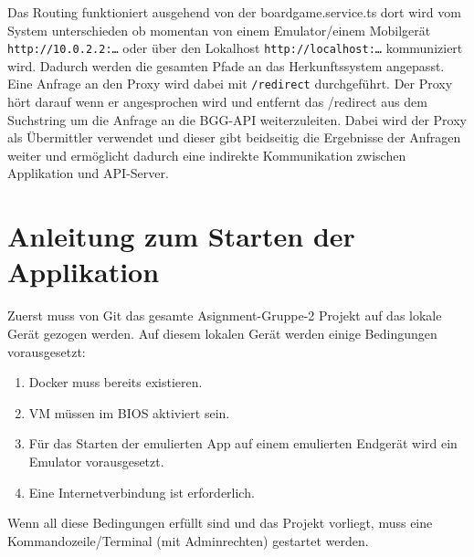 Das Routing funktioniert ausgehend von der boardgame.service.ts dort wird vom System
unterschieden ob momentan von einem Emulator/einem Mobilgerät \texttt{http://10.0.2.2:\dots} oder über den
Lokalhost \texttt{http://localhost:\dots} kommuniziert wird. Dadurch werden die gesamten Pfade an das
Herkunftssystem angepasst. Eine Anfrage an den Proxy wird dabei mit \texttt{/redirect} durchgeführt. Der
Proxy hört darauf wenn er angesprochen wird und entfernt das /redirect aus dem Suchstring um die
Anfrage an die BGG-API weiterzuleiten. Dabei wird der Proxy als Übermittler verwendet und dieser
gibt beidseitig die Ergebnisse der Anfragen weiter und ermöglicht dadurch eine indirekte
Kommunikation zwischen Applikation und API-Server.
\section{Anleitung zum Starten der Applikation}
Zuerst muss von Git das gesamte Asignment-Gruppe-2 Projekt auf das lokale Gerät gezogen werden.
Auf diesem lokalen Gerät werden einige Bedingungen vorausgesetzt:
\begin{enumerate}
    \item Docker muss bereits existieren.
    \item \ac{VM} müssen im \ac{BIOS} aktiviert sein.
    \item Für das Starten der emulierten App auf einem emulierten Endgerät wird ein Emulator vorausgesetzt.
    \item Eine Internetverbindung ist erforderlich.
\end{enumerate}
Wenn all diese Bedingungen erfüllt sind und das Projekt vorliegt, muss eine Kommandozeile/Terminal
(mit Adminrechten) gestartet werden.
